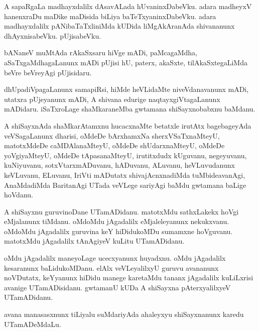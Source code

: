 \documentclass{article}
\begin{document}
\begin{mn}
A  sapaRgaLa  madhayxdalilx  dAsavALada  hUvaninxDabeVku.  adara  madheyxV  hanenxraDu  maDike  maDisida  biLiya  
baTeTxyaninxDabeVku.  adara  madhayxdalilx  pANibaTaTxliniMda  kUDida  liMgAkAranAda  shivananunx  dhAyxnisabeVku.  pUjisabeVku.
\end{mn}

\begin{mn}
bANaneV  muMtAda  rAkaSxsaru  hiVge  mADi,  paMcagaMdha,  aSaTxgaMdhagaLanunx  mADi  pUjisi  hU,  paterx,  
akaSxte,  tilAkaSxtegaLiMda  beVre beVreyAgi  pUjisidaru.
\end{mn}

\begin{mn}
dhUpadiVpagaLanunx  samapiRsi,  hiMde  heVLidaMte  niveVdanavanunx  mADi,  utatxra  pUjeyanunx  mADi,  A  shivana  
edurige  naqtayxgiVtagaLanunx  mADidaru.  iSaTxroLage  shaMkaraneMba  gwtamana  shiSayxnobabxnu  baMdanu.
\end{mn}

\begin{mn}
A  shiSayxnAda  shaMkarAtamxnu  hucacxnaMte  betatxle  irutAtx  bagebageyAda  veVSagaLanunx  dharisi,  
oMdeDe  bArxhamxNa  sherxVSaTxnaMteyU,  matotxMdeDe  caMDAlanaMteyU,  oMdeDe  shUdarxnaMteyU,  oMdeDe  
yoVgiyaMteyU,  oMdeDe  tApasanaMteyU,  irutitxdudx  kUguvanu,  negeyuvanu,  kuNiyuvanu,  sotxVtarxmADuvanu,  
hADuvanu,  ALuvanu,  heVLuvudanunx  keVLuvanu,  ELuvanu,  IriVti  mADutatx  shivajAcnxnadiMda  tuMbideavanAgi,  
AnaMdadiMda  BaritanAgi  UTada  veVLege  sariyAgi  baMdu  gwtamana  baLige  hoVdanu.
\end{mn}

\begin{mn}
A  shiSayxnu  guruvinoDane  UTamADidanu.  matotxMdu  sathxLakekx  hoVgi  eMjalanunx  tiMdanu.  oMdoMdu  
jAgadalilx  eMjaleleyanunx  nekukxvanu.  oMdoMdu  jAgadalilx  guruvina  keY hiDidukoMDu  sumamxne  hoVguvanu.  
matotxMdu  jAgadalilx  tAnAgiyeV  kuLitu  UTamADidanu.
\end{mn}

\begin{mn}
oMdu  jAgadalilx  maneyoLage  ucecxyanunx  huyadxnu.  oMdu  jAgadalilx  kesaranunx  baLidukoMDanu.  
elAlx  veVLeyalilxyU  guruvu  avananunx  noVDutatx,  keYyanunx  hiDidu  manege  karetaMdu  tananx  
jAgadalilx  kuLiLxrisi  avanige  UTamADisidanu.  gwtamanU  kUDa  A  shiSayxna  pAterxyalilxyeV  UTamADidanu.
\end{mn}

\begin{mn}
avana  manasasxnunx  tiLiyalu  suMdariyAda  ahaleyxyu  shiSayxnanunx  karedu  UTamADeMdaLu.
\end{mn}
\end{document}
